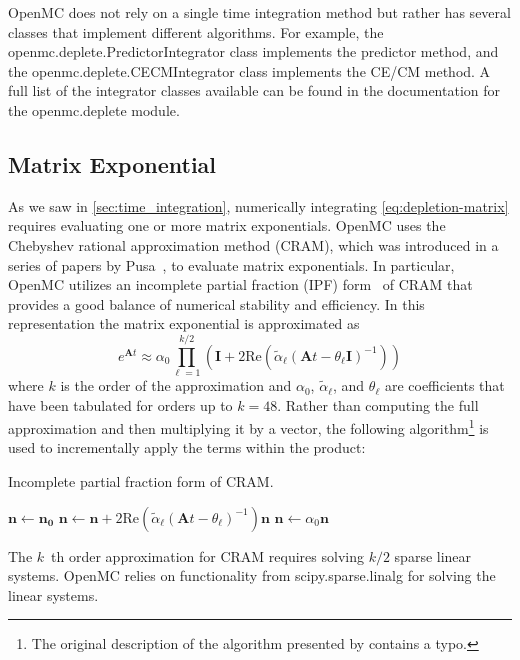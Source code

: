 \documentclass[3p,authoryear]{elsarticle}
\begin{document}
OpenMC does not rely on a single time integration method but rather has several
classes that implement different algorithms. For example, the
openmc.deplete.PredictorIntegrator class implements the predictor
method, and the openmc.deplete.CECMIntegrator class implements the
CE/CM method. A full list of the integrator classes available can be found in
the documentation for the openmc.deplete module.

\subsection{Matrix Exponential}

As we saw in \cref{sec:time_integration}, numerically integrating
\cref{eq:depletion-matrix} requires evaluating one or more matrix exponentials.
OpenMC uses the Chebyshev rational approximation method (CRAM), which was
introduced in a series of papers by Pusa~\citep{pusa2010nse,pusa2011nse}, to
evaluate matrix exponentials. In particular, OpenMC utilizes an incomplete
partial fraction (IPF) form~\citep{pusa2016nse} of CRAM that provides a good
balance of numerical stability and efficiency. In this representation the matrix
exponential is approximated as
\begin{equation}
    e^{\mathbf{A}t} \approx \alpha_0 \prod\limits_{\ell=1}^{k/2} \left (
    \mathbf{I} + 2 \text{Re} \left ( \widetilde{\alpha}_\ell \left (\mathbf{A}t
    - \theta_\ell \mathbf{I} \right )^{-1} \right ) \right )
\end{equation}
where $k$ is the order of the approximation and $\alpha_0$,
$\widetilde{\alpha}_\ell$, and $\theta_\ell$ are coefficients that have been
tabulated for orders up to $k=48$. Rather than computing the full approximation
and then multiplying it by a vector, the following algorithm\footnote{The
original description of the algorithm presented by \citet{pusa2016nse} contains
a typo.} is used to incrementally apply the terms within the product:
\begin{algorithm}[H]
  \caption{Incomplete partial fraction form of CRAM.}
  \label{alg:cram}
  \begin{algorithmic}[1]
    \State $\mathbf{n} \gets \mathbf{n_0}$
      \State $\mathbf{n} \gets \mathbf{n} + 2\text{Re}(\widetilde{\alpha}_\ell
        (\mathbf{A}t - \theta_\ell)^{-1})\mathbf{n}$
    \EndFor
    \State $\mathbf{n} \gets \alpha_0 \mathbf{n}$
  \end{algorithmic}
\end{algorithm}
The $k$\ th order approximation for CRAM requires solving $k/2$ sparse linear
systems. OpenMC relies on functionality from scipy.sparse.linalg for solving the
linear systems.
\end{document}
